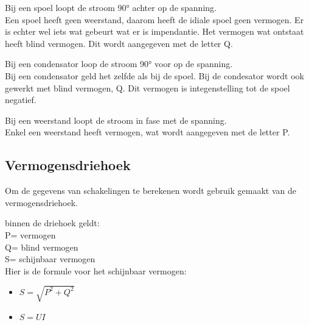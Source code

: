 Bij een spoel loopt de stroom 90° achter op de spanning.\\
Een spoel heeft geen weerstand, daarom heeft de idiale spoel geen vermogen. Er is echter wel iets wat gebeurt wat er is impendantie. Het
vermogen wat ontstaat heeft blind vermogen. Dit wordt aangegeven met de letter Q. 

Bij een condensator loop de stroom 90° voor op de spanning.\\
Bij een condensator geld het zelfde als bij de spoel. Bij de condesator wordt ook gewerkt met blind vermogen, Q. Dit vermogen is integenstelling
tot de spoel negatief.

Bij een weerstand loopt de stroom in fase met de spanning.\\
Enkel een weerstand heeft vermogen, wat wordt aangegeven met de letter P.

\subsection{Vermogensdriehoek}
Om de gegevens van schakelingen te berekenen wordt gebruik gemaakt van de vermogensdriehoek.

\begin{center}

\end{center}

binnen de driehoek geldt:\\
P= vermogen\\
Q= blind vermogen\\
S= schijnbaar vermogen\\

Hier is de formule voor het schijnbaar vermogen:
\begin{itemize}
    \item $S=\sqrt{P^2+Q^2}$
    \item $S= UI$
\end{itemize}

